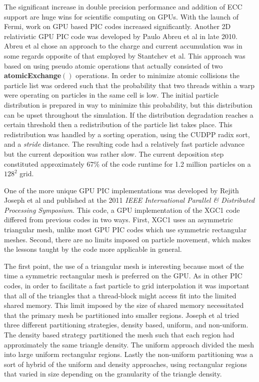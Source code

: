 The significant increase in double precision performance and addition of ECC support are huge wins for scientific computing on GPUs. With the launch of Fermi, work on GPU based PIC codes increased significantly. Another 2D relativistic GPU PIC code was developed by Paulo Abreu et al in late 2010. Abreu et al chose an approach to the charge and current accumulation was in some regards opposite of that employed by Stantchev et al. This approach was based on using pseudo atomic operations that actually consisted of two \textbf{atomicExchange}$()$ operations. In order to minimize atomic collisions the particle list was ordered such that the probability that two threads within a warp were operating on particles in the same cell is low. The initial particle distribution is prepared in way to minimize this probability, but this distribution can be upset throughout the simulation. If the distribution degradation reaches a certain threshold then a redistribution of the particle list takes place. This redistribution was handled by a sorting operation, using the CUDPP radix sort, and a \emph{stride} distance. The resulting code had a relatively fast particle advance but the current deposition was rather slow. The current deposition step constituted approximately 67\% of the code runtime for 1.2 million particles on a $128^2$ grid.\cite{Abreu2011}

One of the more unique GPU PIC implementations was developed by Rejith Joseph et al and published at the 2011 \emph{IEEE International Parallel \& Distributed Processing Symposium}. This code, a GPU implementation of the XGC1 code differed from previous codes in two ways. First, XGC1 uses an asymmetric triangular mesh, unlike most GPU PIC codes which use symmetric rectangular meshes. Second, there are no limits imposed on particle movement, which makes the lessons taught by the code more applicable in general.\cite{Joseph2011}

The first point, the use of a triangular mesh is interesting because most of the time a symmetric rectangular mesh is preferred on the GPU. As in other PIC codes, in order to facilitate a fast particle to grid interpolation it was important that all of the triangles that a thread-block might access fit into the limited shared memory. This limit imposed by the size of shared memory necessitated that the primary mesh be partitioned into smaller regions. Joseph et al tried three different partitioning strategies, density based, uniform, and non-uniform. The density based strategy partitioned the mesh such that each region had approximately the same triangle density. The uniform approach divided the mesh into large uniform rectangular regions. Lastly the non-uniform partitioning was a sort of hybrid of the uniform and density approaches, using rectangular regions that varied in size depending on the granularity of the triangle density.\cite{Joseph2011}

